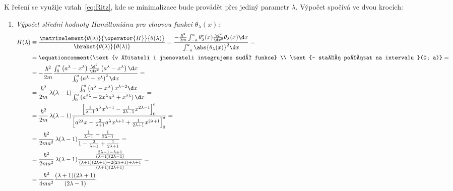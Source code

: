 \begin{solution}
	K řešení se využije vztah~\eqref{eq:Ritz}, kde se minimalizace bude provádět přes jediný parametr $\lambda$.
	Výpočet spočívá ve dvou krocích:
	\begin{enumerate}
	\item
		\emph{Výpočet střední hodnoty Hamiltoniánu pro vlnovou funkci $\theta_{\lambda}(x)$:}
		\begin{align}
			\bar{H}(\lambda)
				&\equiv\frac{\matrixelement{\theta(\lambda)}{\operator{H}}{\theta(\lambda)}}{\braket{\theta(\lambda)}{\theta(\lambda)}}
					=\frac{-\frac{\hbar^{2}}{2m}\int_{-a}^{a}\theta^{*}_{\lambda}(x)\frac{\d^{2}}{\d x^{2}}\theta_{\lambda}(x)\d x}
					{\int_{-a}^{a}\abs{\theta_{\lambda}(x)}^{2}\d x}=\nonumber\\
				&=\equationcomment{\text{v čitateli i jmenovateli integrujeme sudé funkce} \\ \text{-- stačí počítat na intervalu }(0; a)}=\nonumber\\
				&=-\frac{\hbar^{2}}{2m}\frac{\int_{0}^{a}\left(a^{\lambda}-x^{\lambda}\right)
					\frac{\d^{2}}{\d x^{2}}\left(a^{\lambda}-x^{\lambda}\right)\d x}
					{\int_{0}^{a}\left(a^{\lambda}-x^{\lambda}\right)^{2}\d x}=\nonumber\\
				&=\frac{\hbar^{2}}{2m}\,\lambda(\lambda-1)
					\frac{\int_{0}^{a}\left(a^{\lambda}-x^{\lambda}\right)x^{\lambda-2}\d x}
					{\int_{0}^{a}\left(a^{2\lambda}-2x^{\lambda}a^{\lambda}+x^{2\lambda}\right)\d x}=\nonumber\\
				&=\frac{\hbar^{2}}{2m}\,\lambda(\lambda-1)
					\frac{\left[\frac{1}{\lambda-1}a^{\lambda}x^{\lambda-1}-\frac{1}{2\lambda-1}x^{2\lambda-1}\right]_{0}^{a}}
					{\left[a^{2\lambda}x-\frac{2}{\lambda+1}a^{\lambda}x^{\lambda+1}+\frac{1}{2\lambda+1}x^{2\lambda+1}\right]_{0}^{a}}=\nonumber\\
				&=\frac{\hbar^{2}}{2ma^{2}}\,\lambda(\lambda-1)
					\frac{\frac{1}{\lambda-1}-\frac{1}{2\lambda-1}}{1-\frac{2}{\lambda+1}+\frac{1}{2\lambda+1}}=\nonumber\\
				&=\frac{\hbar^{2}}{2ma^{2}}\,\lambda(\lambda-1)
					\frac{\frac{2\lambda-1-\lambda+1}{(\lambda-1)(2\lambda-1)}}
					{\frac{(\lambda+1)(2\lambda+1)-2(2\lambda+1)+\lambda+1}{(\lambda+1)(2\lambda+1)}}=\nonumber\\
				&=\frac{\hbar^{2}}{4ma^{2}}
					\frac{(\lambda+1)(2\lambda+1)}{(2\lambda-1)}.
		\end{align}


\end{enumerate}
\end{solution}
